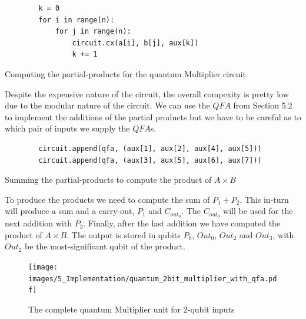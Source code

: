 \begin{listing}[ht]
    \centering
    \begin{verbatim}
        k = 0
        for i in range(n):
            for j in range(n):
                circuit.cx(a[i], b[j], aux[k])
                k += 1
    \end{verbatim}
    \caption{Computing the partial-products for the quantum Multiplier circuit}
\end{listing}

Despite the expensive nature of the circuit, the overall compexity is pretty low due to the modular
nature of the circuit. We can use the $QFA$ from Section 5.2 to implement the additions of the partial products
but we have to be careful as to which pair of inputs we supply the $QFA$s.

\begin{listing}[ht]
    \centering
    \begin{verbatim}
        circuit.append(qfa, (aux[1], aux[2], aux[4], aux[5]))
        circuit.append(qfa, (aux[3], aux[5], aux[6], aux[7]))
    \end{verbatim}
    \caption{Summing the partial-products to compute the product of $A\times B$}
\end{listing}

To produce the products we need to compute the sum of $P_1+P_2$. This in-turn will produce a sum and a carry-out,
$P_1$ and $C_{out_0}$. The $C_{out_0}$ will be used for the next addition with $P_3$. Finally, after the last
addition we have computed the product of $A \times B$. The output is stored in qubits $P_0$, $Out_0$, $Out_2$ and $Out_3$,
with $Out_2$ be the most-significant qubit of the product.

\begin{figure}[ht]
    \centering
    \texttt{[image: images/5\_Implementation/quantum\_2bit\_multiplier\_with\_qfa.pdf]}
    \caption{The complete quantum Multiplier unit for 2-qubit inputs}
\end{figure}